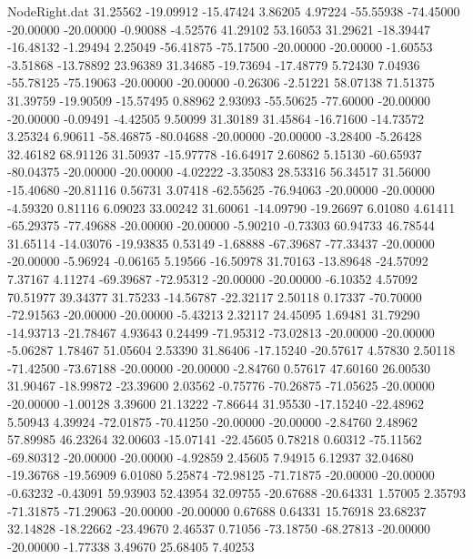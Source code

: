 \begin{filecontents}{NodeRight.dat}
  31.25562  -19.09912  -15.47424     3.86205    4.97224  -55.55938  -74.45000  -20.00000  -20.00000   -0.90088   -4.52576   41.29102   53.16053
  31.29621  -18.39447  -16.48132    -1.29494    2.25049  -56.41875  -75.17500  -20.00000  -20.00000   -1.60553   -3.51868  -13.78892   23.96389
  31.34685  -19.73694  -17.48779     5.72430    7.04936  -55.78125  -75.19063  -20.00000  -20.00000   -0.26306   -2.51221   58.07138   71.51375
  31.39759  -19.90509  -15.57495     0.88962    2.93093  -55.50625  -77.60000  -20.00000  -20.00000   -0.09491   -4.42505    9.50099   31.30189
  31.45864  -16.71600  -14.73572     3.25324    6.90611  -58.46875  -80.04688  -20.00000  -20.00000   -3.28400   -5.26428   32.46182   68.91126
  31.50937  -15.97778  -16.64917     2.60862    5.15130  -60.65937  -80.04375  -20.00000  -20.00000   -4.02222   -3.35083   28.53316   56.34517
  31.56000  -15.40680  -20.81116     0.56731    3.07418  -62.55625  -76.94063  -20.00000  -20.00000   -4.59320    0.81116    6.09023   33.00242
  31.60061  -14.09790  -19.26697     6.01080    4.61411  -65.29375  -77.49688  -20.00000  -20.00000   -5.90210   -0.73303   60.94733   46.78544
  31.65114  -14.03076  -19.93835     0.53149   -1.68888  -67.39687  -77.33437  -20.00000  -20.00000   -5.96924   -0.06165    5.19566  -16.50978
  31.70163  -13.89648  -24.57092     7.37167    4.11274  -69.39687  -72.95312  -20.00000  -20.00000   -6.10352    4.57092   70.51977   39.34377
  31.75233  -14.56787  -22.32117     2.50118    0.17337  -70.70000  -72.91563  -20.00000  -20.00000   -5.43213    2.32117   24.45095    1.69481
  31.79290  -14.93713  -21.78467     4.93643    0.24499  -71.95312  -73.02813  -20.00000  -20.00000   -5.06287    1.78467   51.05604    2.53390
  31.86406  -17.15240  -20.57617     4.57830    2.50118  -71.42500  -73.67188  -20.00000  -20.00000   -2.84760    0.57617   47.60160   26.00530
  31.90467  -18.99872  -23.39600     2.03562   -0.75776  -70.26875  -71.05625  -20.00000  -20.00000   -1.00128    3.39600   21.13222   -7.86644
  31.95530  -17.15240  -22.48962     5.50943    4.39924  -72.01875  -70.41250  -20.00000  -20.00000   -2.84760    2.48962   57.89985   46.23264
  32.00603  -15.07141  -22.45605     0.78218    0.60312  -75.11562  -69.80312  -20.00000  -20.00000   -4.92859    2.45605    7.94915    6.12937
  32.04680  -19.36768  -19.56909     6.01080    5.25874  -72.98125  -71.71875  -20.00000  -20.00000   -0.63232   -0.43091   59.93903   52.43954
  32.09755  -20.67688  -20.64331     1.57005    2.35793  -71.31875  -71.29063  -20.00000  -20.00000    0.67688    0.64331   15.76918   23.68237
  32.14828  -18.22662  -23.49670     2.46537    0.71056  -73.18750  -68.27813  -20.00000  -20.00000   -1.77338    3.49670   25.68405    7.40253

\end{filecontents}
